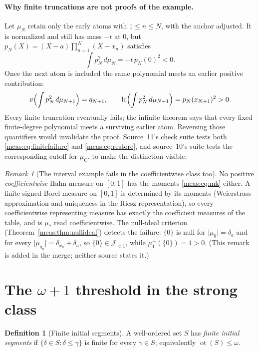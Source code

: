 \documentclass[11pt]{article}
\numberwithin{equation}{section}
\theoremstyle{definition}
\newtheorem{definition}[theorem]{Definition}
\theoremstyle{remark}
\newtheorem{remark}[theorem]{Remark}
\newcommand{\lc}{\operatorname{lc}}
\newcommand{\ot}{\operatorname{ot}}
\newcommand{\abs}[1]{\lvert#1\rvert}
\begin{document}
\paragraph{Why finite truncations are not proofs of the example.} Let $\mu_N$
retain only the early atoms with $1\le n\le N$, with the anchor adjusted. It is
normalized and still has mass $-t$ at $0$, but
$p_N(X)=(X-a)\prod_{n=1}^N(X-x_n)$ satisfies
\begin{equation}\label{meas:eq:finitefailure}
 \int p_N^2\,d\mu_N=-t\,p_N(0)^2<0.
\end{equation}
Once the next atom is included the same polynomial meets an earlier positive
contribution:
\begin{equation}\label{meas:eq:restore}
 v\Bigl(\int p_N^2\,d\mu_{N+1}\Bigr)=q_{N+1},\qquad
 \lc\Bigl(\int p_N^2\,d\mu_{N+1}\Bigr)=p_N(x_{N+1})^2>0.
\end{equation}
Every finite truncation eventually fails; the infinite theorem says that every
fixed finite-degree polynomial meets a surviving earlier atom. Reversing those
quantifiers would invalidate the proof. Source~11's check suite tests both
\eqref{meas:eq:finitefailure} and \eqref{meas:eq:restore}, and source~10's suite
tests the corresponding cutoff for $\mu_{\mathrm C}$, to make the distinction
visible.

\begin{remark}[The interval example fails in the coefficientwise class too]
\label{meas:rem:mustar-coef}
No positive \emph{coefficientwise} Hahn measure on $[0,1]$ has the moments
\eqref{meas:eq:mk} either. A finite signed Borel measure on $[0,1]$ is determined
by its moments (Weierstrass approximation and uniqueness in the Riesz
representation), so every coefficientwise representing measure has exactly the
coefficient measures of the table, and is $\mu_*$ read coefficientwise. The
null-ideal criterion (Theorem~\ref{meas:thm:nullideal}) detects the failure:
$\{0\}$ is null for $\abs{\mu_0}=\delta_a$ and for every
$\abs{\mu_{q_n}}=\delta_{x_n}+\delta_a$, so $\{0\}\in\mathcal J_{<1}$, while
$\mu_1^-(\{0\})=1>0$. (This remark is added in the merge; neither source states
it.)
\end{remark}

\section{The \texorpdfstring{$\omega+1$}{omega+1} threshold in the strong class}
\label{meas:sec:threshold}

\begin{definition}[Finite initial segments]
A well-ordered set $S$ has \emph{finite initial segments} if
$\{\delta\in S:\delta\le\gamma\}$ is finite for every $\gamma\in S$; equivalently
$\ot(S)\le\omega$.
\end{definition}
\end{document}
